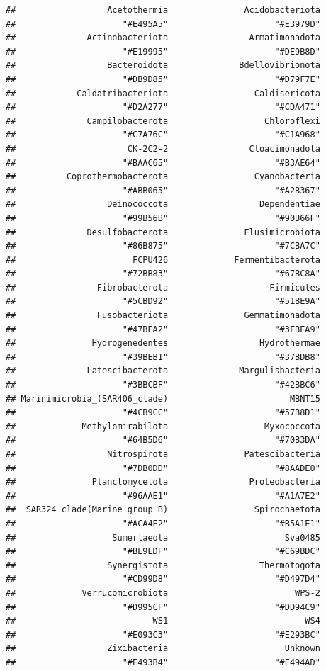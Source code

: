\documentclass[
]{book}
\begin{document}
\begin{verbatim}
##                  Acetothermia               Acidobacteriota 
##                     "#E495A5"                     "#E3979D" 
##              Actinobacteriota                Armatimonadota 
##                     "#E19995"                     "#DE9B8D" 
##                  Bacteroidota              Bdellovibrionota 
##                     "#DB9D85"                     "#D79F7E" 
##            Caldatribacteriota                 Caldisericota 
##                     "#D2A277"                     "#CDA471" 
##              Campilobacterota                   Chloroflexi 
##                     "#C7A76C"                     "#C1A968" 
##                      CK-2C2-2                Cloacimonadota 
##                     "#BAAC65"                     "#B3AE64" 
##          Coprothermobacterota                 Cyanobacteria 
##                     "#ABB065"                     "#A2B367" 
##                  Deinococcota                  Dependentiae 
##                     "#99B56B"                     "#90B66F" 
##              Desulfobacterota               Elusimicrobiota 
##                     "#86B875"                     "#7CBA7C" 
##                       FCPU426             Fermentibacterota 
##                     "#72BB83"                     "#67BC8A" 
##                Fibrobacterota                    Firmicutes 
##                     "#5CBD92"                     "#51BE9A" 
##                Fusobacteriota               Gemmatimonadota 
##                     "#47BEA2"                     "#3FBEA9" 
##               Hydrogenedentes                  Hydrothermae 
##                     "#39BEB1"                     "#37BDB8" 
##              Latescibacterota              Margulisbacteria 
##                     "#3BBCBF"                     "#42BBC6" 
## Marinimicrobia_(SAR406_clade)                        MBNT15 
##                     "#4CB9CC"                     "#57B8D1" 
##             Methylomirabilota                   Myxococcota 
##                     "#64B5D6"                     "#70B3DA" 
##                  Nitrospirota               Patescibacteria 
##                     "#7DB0DD"                     "#8AADE0" 
##               Planctomycetota                Proteobacteria 
##                     "#96AAE1"                     "#A1A7E2" 
##  SAR324_clade(Marine_group_B)                 Spirochaetota 
##                     "#ACA4E2"                     "#B5A1E1" 
##                   Sumerlaeota                       Sva0485 
##                     "#BE9EDF"                     "#C69BDC" 
##                  Synergistota                  Thermotogota 
##                     "#CD99D8"                     "#D497D4" 
##             Verrucomicrobiota                         WPS-2 
##                     "#D995CF"                     "#DD94C9" 
##                           WS1                           WS4 
##                     "#E093C3"                     "#E293BC" 
##                  Zixibacteria                       Unknown 
##                     "#E493B4"                     "#E494AD"
\end{verbatim}
\end{document}
